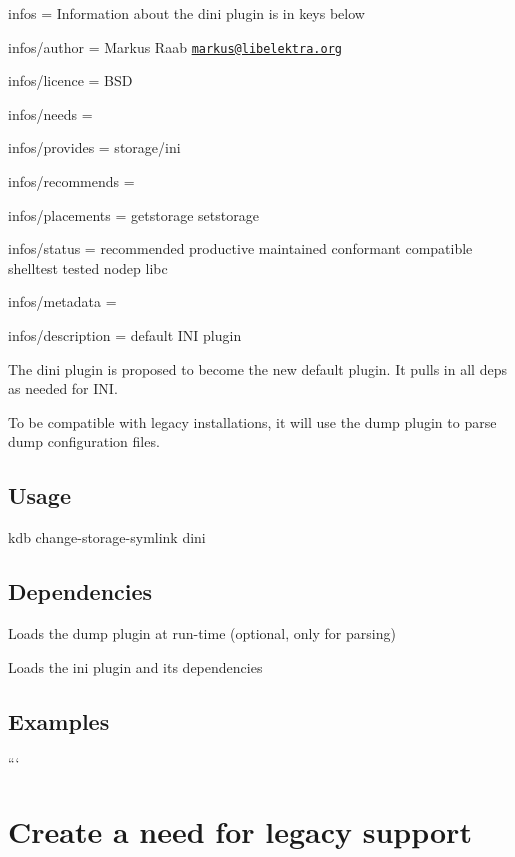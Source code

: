 
\begin{DoxyItemize}
\item infos = Information about the dini plugin is in keys below
\item infos/author = Markus Raab \href{mailto:markus@libelektra.org}{\tt markus@libelektra.\+org}
\item infos/licence = B\+SD
\item infos/needs =
\item infos/provides = storage/ini
\item infos/recommends =
\item infos/placements = getstorage setstorage
\item infos/status = recommended productive maintained conformant compatible shelltest tested nodep libc
\item infos/metadata =
\item infos/description = default I\+NI plugin
\end{DoxyItemize}

The dini plugin is proposed to become the new default plugin. It pulls in all deps as needed for I\+NI.

To be compatible with legacy installations, it will use the dump plugin to parse dump configuration files.

\subsection*{Usage}


\begin{DoxyCode}
kdb change-storage-symlink dini
\end{DoxyCode}


\subsection*{Dependencies}


\begin{DoxyItemize}
\item Loads the {\ttfamily dump} plugin at run-\/time (optional, only for parsing)
\item Loads the {\ttfamily ini} plugin and its dependencies
\end{DoxyItemize}

\subsection*{Examples}

``` \section*{Create a need for legacy support}

